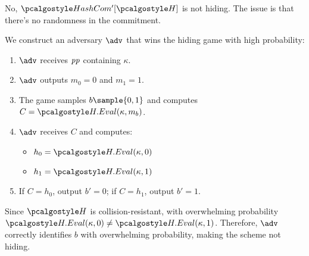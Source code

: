 \ifsolutions
\begin{mysolution}
  No, $\algo{HashCom'}[\algo{H}]$ is not hiding.
  The issue is that there's no randomness in the commitment.
  
  We construct an adversary $\adv$ that wins the hiding game with high probability:
  
  \begin{enumerate}
    \item $\adv$ receives $\mathit{pp}$ containing $\kappa$.
    \item $\adv$ outputs $m_0 = 0$ and $m_1 = 1$.
    \item The game samples $b \sample \{0, 1\}$ and computes $C = \algo{H.Eval}(\kappa, m_b)$.
    \item $\adv$ receives $C$ and computes:
      \begin{itemize}
        \item $h_0 = \algo{H.Eval}(\kappa, 0)$
        \item $h_1 = \algo{H.Eval}(\kappa, 1)$
      \end{itemize}
    \item If $C = h_0$, output $b' = 0$; if $C = h_1$, output $b' = 1$.
  \end{enumerate}
  
  Since $\algo{H}$ is collision-resistant, with overwhelming probability $\algo{H.Eval}(\kappa, 0) \neq \algo{H.Eval}(\kappa, 1)$.
  Therefore, $\adv$ correctly identifies $b$ with overwhelming probability, making the scheme not hiding.
\end{mysolution}
\fi

